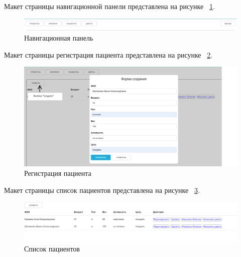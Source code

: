 Макет страницы навигационной панели представлена на рисунке ~\ref{fig:imagen}.
\begin{figure}[H]
	\centering
	\includegraphics[width=1\linewidth]{images/Нав.панель}
	\caption{Навигационная панель}
	\label{fig:imagen}
\end{figure}

Макет страницы регистрация пациента представлена на рисунке ~\ref{fig:imagep}.
\begin{figure}[H]
	\centering
	\includegraphics[width=1\linewidth]{"images/Регистрация пациента"}
	\caption{Регистрация пациента}
	\label{fig:imagep}
\end{figure}

Макет страницы список пациентов представлена на рисунке ~\ref{fig:images}.
\begin{figure}[H]
	\centering
	\includegraphics[width=1\linewidth]{"images/Список пациентов"}
	\caption{Список пациентов}
	\label{fig:images}
\end{figure}

